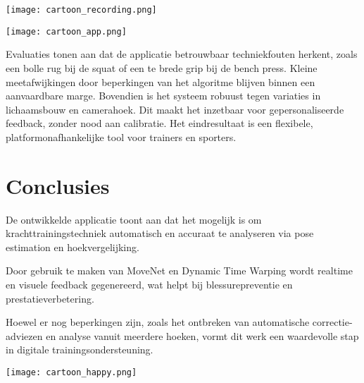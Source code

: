 \documentclass[a0,portrait]{hogent-poster}
\begin{document}
\begin{multicols}{2}
\begin{minipage}[t]{0.48\linewidth}
 \end{minipage}
\hfill
\begin{minipage}[t]{0.48\linewidth}
\texttt{[image: cartoon\_recording.png]}
\end{minipage}
\vspace{1em}


\noindent
\begin{minipage}[t]{0.48\linewidth}
\texttt{[image: cartoon\_app.png]}
\end{minipage}
\hfill
\begin{minipage}[t]{0.48\linewidth}


 Evaluaties tonen aan dat de applicatie betrouwbaar techniekfouten herkent, zoals een bolle rug bij de squat of een te brede grip bij de bench press. 
 Kleine meetafwijkingen door beperkingen van het algoritme blijven binnen een aanvaardbare marge. Bovendien is het systeem robuust tegen variaties in lichaamsbouw en camerahoek.
 Dit maakt het inzetbaar voor gepersonaliseerde feedback, zonder nood aan calibratie. Het eindresultaat is een flexibele, platformonafhankelijke tool voor trainers en sporters.

 \end{minipage}
\vspace{1em}

\section{Conclusies}

\noindent
\begin{minipage}[t]{0.48\linewidth}
 
De ontwikkelde applicatie toont aan dat het mogelijk is om krachttrainingstechniek automatisch en accuraat te analyseren via pose estimation en hoekvergelijking. 

Door gebruik te maken van MoveNet en Dynamic Time Warping wordt realtime en visuele feedback gegenereerd, wat helpt bij blessurepreventie en prestatieverbetering. 

Hoewel er nog beperkingen zijn, zoals het ontbreken van automatische correctie-adviezen en analyse vanuit meerdere hoeken, vormt dit werk een waardevolle stap in digitale trainingsondersteuning.

\end{minipage}
\hfill
\begin{minipage}[t]{0.48\linewidth}
\texttt{[image: cartoon\_happy.png]}
\end{minipage}
\vspace{1em}


\end{multicols}
\end{document}
